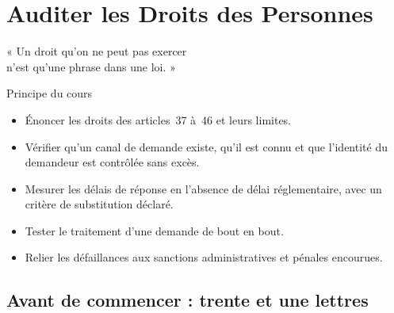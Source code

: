 
\chapter{Auditer les Droits des Personnes}
\label{chap:droits}

\epigraph{%
    « Un droit qu'on ne peut pas exercer\\
    n'est qu'une phrase dans une loi. »%
}{Principe du cours}


\begin{boxobjectifs}
\begin{itemize}
    \item Énoncer les droits des articles~37 à~46 et leurs limites.
    \item Vérifier qu'un canal de demande existe, qu'il est connu et que
          l'identité du demandeur est contrôlée sans excès.
    \item Mesurer les délais de réponse en l'absence de délai réglementaire,
          avec un critère de substitution déclaré.
    \item Tester le traitement d'une demande de bout en bout.
    \item Relier les défaillances aux sanctions administratives et pénales
          encourues.
\end{itemize}
\end{boxobjectifs}

\bigskip

\section*{Avant de commencer : trente et une lettres}

